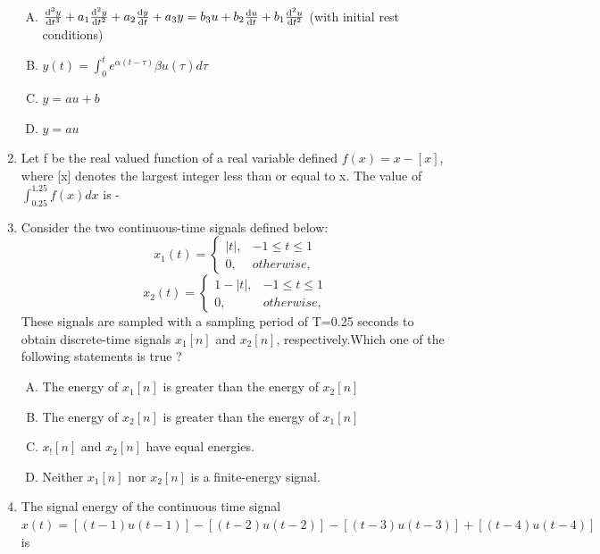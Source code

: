 \documentclass[journal,12pt,twocolumn]{IEEEtran}
\begin{document}
\begin{enumerate}
\begin{enumerate}[(A)]
\item $\dv[3]{y}{t}+a_1\dv[2]{y}{t}+a_2\dv{y}{t}+a_3y=b_3u+b_2\dv{u}{t}+b_1\dv[2]{u}{t}$ (with initial rest conditions)
\item $y(t)={\int_{0}^{t}e^{\alpha(t-\tau)}\beta u(\tau)}d\tau$

\item $y=au+b$

\item $y=au$

\end{enumerate}
\item Let f be the real valued function of a real variable defined $f(x)=x-[x]$, where [x] denotes the largest integer less than or equal to x. The value of $ {\int_{0.25}^{1.25} f(x) }dx $ is - \underline{\hspace{2cm}}

\item Consider the two continuous-time signals defined below: 
\[
	x_1(t)=\begin{cases}
		|t|, &  {-1\leq t \leq 1}  \\
		0, &   otherwise,
	\end{cases}
\] 
\[
	x_2(t)=\begin{cases}
		1-|t|, &  {-1\leq t \leq 1}  \\
		0, &   otherwise,
	\end{cases}
\]
These signals are sampled with a sampling period of T=0.25 seconds to obtain discrete-time signals $x_1[n]$ and $x_2[n]$, respectively.Which one of the following statements is true ?

\begin{enumerate}[(A)]

\setlength\itemsep{0.5em}

\item The energy of $x_1[n]$ is greater than the energy of $x_2[n]$
\item The energy of $x_2[n]$ is greater than the energy of $x_1[n]$

\item $x_![n]$ and $x_2[n]$ have equal energies.

\item Neither $x_1[n]$ nor $x_2[n]$ is a finite-energy signal.

\end{enumerate}


\item The signal energy of the continuous time signal
$x(t)=[(t-1)u(t-1)]-[(t-2)u(t-2)]-[(t-3)u(t-3)]+[(t-4)u(t-4)]$ is
\begin{enumerate}[(A)]


\end{enumerate}
\end{enumerate}
\end{document}
